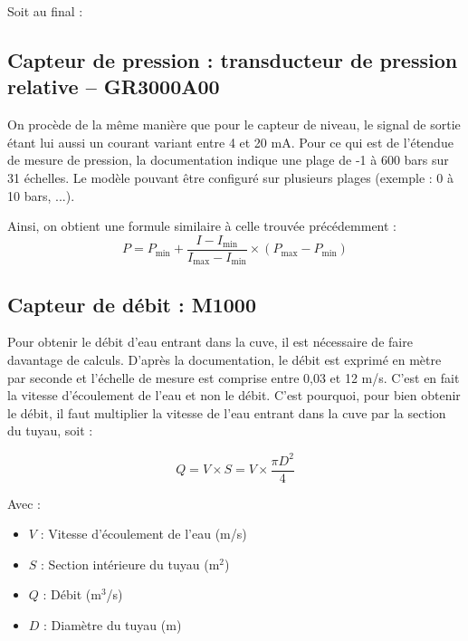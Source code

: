 \documentclass[12pt,a4paper]{article}
\begin{document}
Soit au final :
\begin{center}
\end{center}


\subsection{Capteur de pression : transducteur de pression relative -- GR3000A00}

On procède de la même manière que pour le capteur de niveau, le signal de sortie étant lui aussi un courant variant entre 4 et 20 mA. Pour ce qui est de l'étendue de mesure de pression, la documentation indique une plage de -1 à 600 bars sur 31 échelles. Le modèle pouvant être configuré sur plusieurs plages (exemple : 0 à 10 bars, ...). 

Ainsi, on obtient une formule similaire à celle trouvée précédemment :
\begin{equation*}
    \boxed{P = P_{\mathrm{min}} + \frac{I - I_{\mathrm{min}}}{I_{\mathrm{max}} - I_{\mathrm{min}}} \times (P_{\mathrm{max}} - P_{\mathrm{min}})}
\end{equation*}


\subsection{Capteur de débit : M1000}

Pour obtenir le débit d'eau entrant dans la cuve, il est nécessaire de faire davantage de calculs. D'après la documentation, le débit est exprimé en mètre par seconde et l'échelle de mesure est comprise entre 0,03 et 12 m/s. C'est en fait la vitesse d'écoulement de l'eau et non le débit. C'est pourquoi, pour bien obtenir le débit, il faut multiplier la vitesse de l'eau entrant dans la cuve par la section du tuyau, soit :

\begin{equation*}
    \boxed{Q = V \times S = V \times \frac{\pi D^2}{4}}
\end{equation*}

Avec :
\begin{itemize}
    \item $V$ : Vitesse d'écoulement de l'eau (m/s)
    \item $S$ : Section intérieure du tuyau (m$^2$)
    \item $Q$ : Débit (m$^3$/s)
    \item $D$ : Diamètre du tuyau (m)
\end{itemize}
\end{document}
